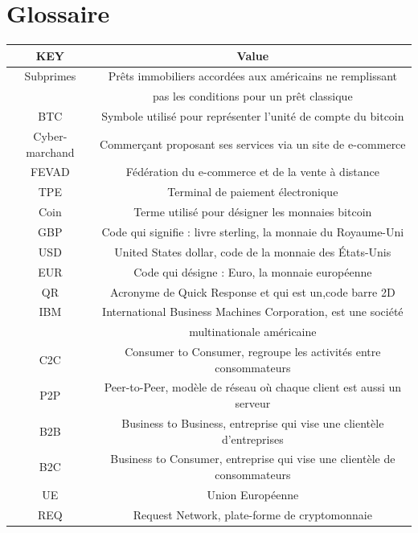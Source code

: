 \documentclass[12pt]{report}
\begin{document}
\section{Glossaire}
\begin{tabular}{|c|c|}
\hline 
\rowcolor{green}KEY & Value \\

\hline
Subprimes & Prêts immobiliers accordées aux américains ne remplissant \\ & pas les conditions pour un prêt classique \\ 

\hline 
BTC & Symbole utilisé pour représenter l'unité de compte du bitcoin \\

\hline
Cyber-marchand & Commerçant proposant ses services via un site de e-commerce \\

\hline
FEVAD & Fédération du e-commerce et de la vente à distance\\

\hline
TPE & Terminal de paiement électronique\\

\hline
Coin & Terme utilisé pour désigner les monnaies bitcoin\\

\hline
GBP & Code qui signifie : livre sterling, la monnaie du Royaume-Uni\\

\hline
USD & United States dollar, code de la monnaie des États-Unis \\

\hline
EUR & Code qui désigne : Euro, la monnaie européenne \\

\hline
QR & Acronyme de Quick Response et qui est un,code barre 2D\\

\hline
IBM & International Business Machines Corporation, est une société \\ & multinationale américaine\\

\hline
C2C & Consumer to Consumer, regroupe les activités entre consommateurs\\  

\hline
P2P & Peer-to-Peer, modèle de réseau où chaque client est aussi un serveur\\

\hline
B2B & Business to Business, entreprise qui vise une clientèle d'entreprises\\

\hline
B2C & Business to Consumer, entreprise qui vise une clientèle de consommateurs\\

\hline
UE & Union Européenne \\

\hline
REQ & Request Network, plate-forme de cryptomonnaie\\

\hline 
\end{tabular} 
\end{document}

